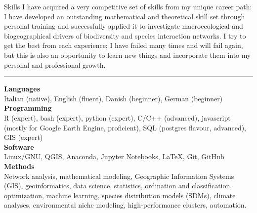 \documentclass{resume} %
\newcommand{\spazio}{\begin{center} \par\noindent\rule{0.2\textwidth}{0.4pt} \end{center}}
\begin{document}
\begin{rSection}{Skills}
I have acquired a very competitive set of skills from my unique career path: I have developed an outstanding mathematical and theoretical skill set through personal training and successfully applied it to investigate macroecological and biogeographical drivers of biodiversity and species interaction networks.
I try to get the best from each experience; I have failed many times and will fail again, but this is also an opportunity to learn new things and incorporate them into my personal and professional growth.

\spazio

{\bf Languages}\\
Italian (native), English (fluent), Danish (beginner), German (beginner)\\
{\bf Programming}\\
R (expert), bash (expert), python (expert), C/C++ (advanced), javascript (mostly for Google Earth Engine, proficient), SQL (postgres flavour, advanced), GIS (expert)\\
{\bf Software} \\
Linux/GNU, QGIS, Anaconda, Jupyter Notebooks, \LaTeX, Git, GitHub\\
{\bf Methods} \\
Network analysis,
mathematical modeling,
Geographic Information Systems (GIS),
geoinformatics,
data science,
statistics,
ordination and classification,
optimization,
machine learning,
species distribution models (SDMs),
climate analyses,
environmental niche modeling,
high-performance clusters, 
automation.
\end{rSection}
\end{document}
